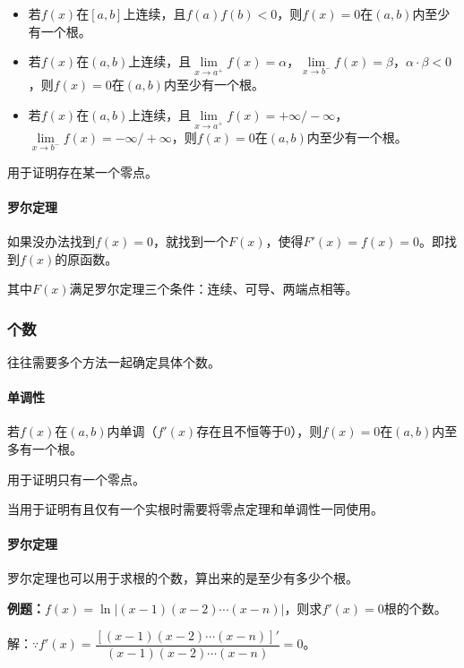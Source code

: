 \documentclass[UTF8, 12pt]{ctexart}
\begin{document}
\begin{itemize}
    \item 若$f(x)$在$[a,b]$上连续，且$f(a)f(b)<0$，则$f(x)=0$在$(a,b)$内至少有一个根。
    \item 若$f(x)$在$(a,b)$上连续，且$\lim\limits_{x\to a^+}f(x)=\alpha$，$\lim\limits_{x\to b^-}f(x)=\beta$，$\alpha\cdot\beta<0$，则$f(x)=0$在$(a,b)$内至少有一个根。
    \item 若$f(x)$在$(a,b)$上连续，且$\lim\limits_{x\to a^+}f(x)=+\infty/-\infty$，$\lim\limits_{x\to b^-}f(x)=-\infty/+\infty$，则$f(x)=0$在$(a,b)$内至少有一个根。
\end{itemize}

用于证明存在某一个零点。

\paragraph{罗尔定理} \leavevmode \medskip

如果没办法找到$f(x)=0$，就找到一个$F(x)$，使得$F'(x)=f(x)=0$。即找到$f(x)$的原函数。

其中$F(x)$满足罗尔定理三个条件：连续、可导、两端点相等。

\subsubsection{个数}

往往需要多个方法一起确定具体个数。

\paragraph{单调性} \leavevmode \medskip

若$f(x)$在$(a,b)$内单调（$f'(x)$存在且不恒等于0），则$f(x)=0$在$(a,b)$内至多有一个根。

用于证明只有一个零点。

当用于证明有且仅有一个实根时需要将零点定理和单调性一同使用。

\paragraph{罗尔定理} \leavevmode \medskip

罗尔定理也可以用于求根的个数，算出来的是至少有多少个根。

\textbf{例题：}$f(x)=\ln\vert(x-1)(x-2)\cdots(x-n)\vert$，则求$f'(x)=0$根的个数。

解：$\because f'(x)=\dfrac{[(x-1)(x-2)\cdots(x-n)]'}{(x-1)(x-2)\cdots(x-n)}=0$。
\end{document}
